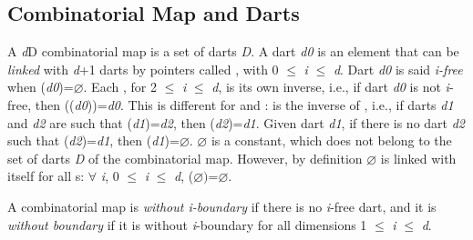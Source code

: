 \subsection{Combinatorial Map and Darts}\label{ssec-combi-map-and-darts}
A \emph{d}D combinatorial map is a set of darts \emph{D}. A dart \emph{d0} is an
element that can be \emph{linked} with \emph{d}+1 darts by pointers called
\betai{}, with 0 $\leq$ \emph{i} $\leq$ \emph{d}.  Dart \emph{d0} is said \emph{i-free}
when \betai{}(\emph{d0})=$\varnothing$.  Each \betai{}, for 2 $\leq$ \emph{i} $\leq$ \emph{d},
is its own inverse, i.e., if dart \emph{d0} is not \emph{i}-free, then
\betai{}(\betai{}(\emph{d0}))=\emph{d0}.  This is different for \betazero{} and
\betaun{}: \betazero{} is the inverse of \betaun{}, i.e., if darts \emph{d1}
and \emph{d2} are such that \betaun{}(\emph{d1})=\emph{d2}, then
\betazero{}(\emph{d2})=\emph{d1}. Given dart \emph{d1}, if there is no dart \emph{d2} such
that \betaun{}(\emph{d2})=\emph{d1}, then \betazero{}(\emph{d1})=$\varnothing$.  $\varnothing$
is a constant, which does not belong to the set of darts \emph{D} of the
combinatorial map. However, by definition $\varnothing$ is linked with
itself for all \betai{}s: $\forall$ \emph{i}, 0 $\leq$ \emph{i} $\leq$ \emph{d},
\betai{}($\varnothing)$=$\varnothing$.




A combinatorial map is \emph{without i-boundary} if there is no
\emph{i}-free dart, and it is \emph{without boundary} if it is without
\emph{i}-boundary for all dimensions 1 $\leq$ \emph{i} $\leq$ \emph{d}.


